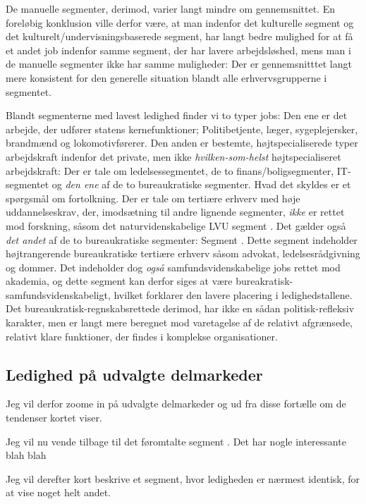 De manuelle segmenter, derimod, varier langt mindre om gennemsnittet. En foreløbig konklusion ville derfor være, at man indenfor det kulturelle segment og det kulturelt/undervisningsbaserede segment, har langt bedre mulighed for at få et andet job indenfor samme segment, der har lavere arbejdsløshed, mens man i de manuelle segmenter ikke har samme muligheder: Der er gennemsnitttet langt mere konsistent for den generelle situation blandt alle erhvervsgrupperne i segmentet.  

Blandt segmenterne med lavest ledighed finder vi to typer jobs: Den ene er det arbejde, der udfører statens kernefunktioner; Politibetjente, læger, sygeplejersker, brandmænd og lokomotivførerer. Den anden er bestemte, højtspecialiserede typer arbejdskraft indenfor det private, men ikke \emph{hvilken-som-helst} højtspecialiseret arbejdskraft: Der er tale om ledelsessegmentet, de to finans/boligsegmenter, IT-segmentet og \emph{den ene} af de to bureaukratiske segmenter.  Hvad det skyldes er et spørgsmål om fortolkning. Der er tale om tertiære erhverv med høje uddannelseskrav, der, imodsætning til andre lignende segmenter, \emph{ikke} er rettet mod forskning, såsom det naturvidenskabelige LVU segment . Det gælder også \emph{det andet} af de to bureaukratiske segmenter: Segment . Dette segment indeholder højtrangerende bureaukratiske tertiære erhverv såsom advokat, ledelsesrådgivning og dommer. Det indeholder dog \emph{også} samfundsvidenskabelige jobs rettet mod akademia, og dette segment kan derfor siges at være bureakratisk-samfundsvidenskabeligt, hvilket forklarer den lavere placering i ledighedstallene. Det bureaukratisk-regnskabsrettede derimod, har ikke en sådan politisk-refleksiv karakter, men er langt mere beregnet mod varetagelse af de relativt afgrænsede, relativt klare funktioner, der findes i komplekse organisationer. 

%
\subsection{Ledighed på udvalgte delmarkeder}
%

 Jeg vil derfor zoome in på udvalgte delmarkeder og ud fra disse fortælle om de tendenser kortet viser. 

Jeg vil nu vende tilbage til det føromtalte segment . Det har nogle interessante blah blah

Jeg vil derefter kort beskrive et segment, hvor ledigheden er nærmest identisk, for at vise noget helt andet.



